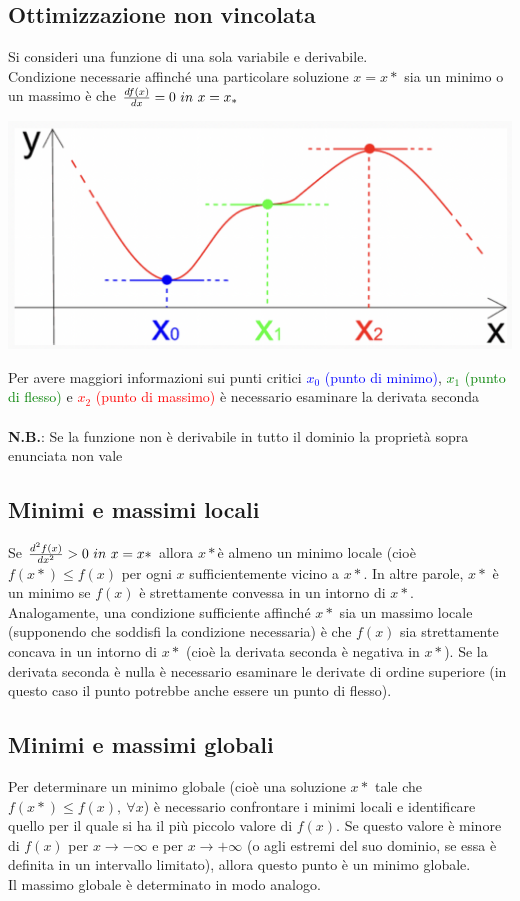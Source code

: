 \documentclass[12pt,a4paper]{article}
\begin{document}
\subsection{Ottimizzazione non vincolata}
Si consideri una funzione di una sola variabile e derivabile.\\
Condizione necessarie affinché una particolare soluzione $x=x*$ sia un minimo o un massimo è che ${df(x) \over dx} = 0 \ in \ x=x_*$\\
\begin{center}
\includegraphics[width=0.3\columnwidth]{img/punti_critici.png}
\end{center}
Per avere maggiori informazioni sui punti critici \textcolor{blue}{$x_0$ (punto di minimo)}, \textcolor{green}{$x_1$ (punto di flesso)} e \textcolor{red}{$x_2$ (punto di massimo)} è necessario esaminare la derivata seconda\\
\\
\textbf{N.B.}: Se la funzione non è derivabile in tutto il dominio la proprietà sopra enunciata non vale

\subsection{Minimi e massimi locali}
Se ${d^2f(x) \over dx^2} > 0 \ in \ x=x*$ allora $x*$è almeno un minimo locale (cioè $f(x*) \leq f(x)$ per ogni $x$ sufficientemente vicino a $x*$. In altre parole, $x*$ è un minimo se $f(x)$ è strettamente convessa in un intorno di $x*$.\\
Analogamente, una condizione sufficiente affinché $x*$ sia un massimo locale (supponendo che soddisfi la condizione necessaria) è che $f(x)$ sia strettamente concava in un intorno di $x*$ (cioè la derivata seconda è negativa in $x*$). Se la derivata seconda è nulla è necessario esaminare le derivate di ordine superiore (in questo caso il punto potrebbe anche essere un punto di flesso).

\subsection{Minimi e massimi globali}
Per determinare un minimo globale (cioè una soluzione $x*$ tale che $f(x*) \leq f(x), \ \forall x$) è necessario confrontare i minimi locali e identificare quello per il quale si ha il più piccolo valore di $f(x)$. Se questo valore è minore di $f(x)$ per $x \rightarrow - \infty$ e per $x \rightarrow + \infty$ (o agli estremi del suo dominio, se essa è definita in un intervallo limitato),
allora questo punto è un minimo globale.\\
Il massimo globale è determinato in modo analogo.
\end{document}
